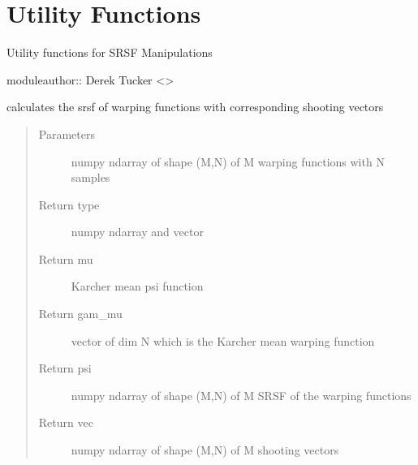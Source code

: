 \documentclass[letterpaper,10pt,english]{sphinxmanual}
\begin{document}
\chapter{Utility Functions}
\label{\detokenize{utility_functions:module-utility_functions}}\label{\detokenize{utility_functions:utility-functions}}\label{\detokenize{utility_functions::doc}}
Utility functions for SRSF Manipulations

moduleauthor:: Derek Tucker \textless{}\textgreater{}

\begin{fulllineitems}
\label{\detokenize{utility_functions:utility_functions.SqrtMean}}
calculates the srsf of warping functions with corresponding shooting vectors
\begin{quote}\begin{description}
\item[{Parameters}] \leavevmode
{} \textendash{} numpy ndarray of shape (M,N) of M warping functions
with N samples

\item[{Return type}]  numpy ndarray and vector

\item[{Return mu}] \leavevmode
Karcher mean psi function

\item[{Return gam\_mu}] \leavevmode
vector of dim N which is the Karcher mean warping function

\item[{Return psi}] \leavevmode
numpy ndarray of shape (M,N) of M SRSF of the warping functions

\item[{Return vec}] \leavevmode
numpy ndarray of shape (M,N) of M shooting vectors

\end{description}\end{quote}

\end{fulllineitems}
\end{document}
